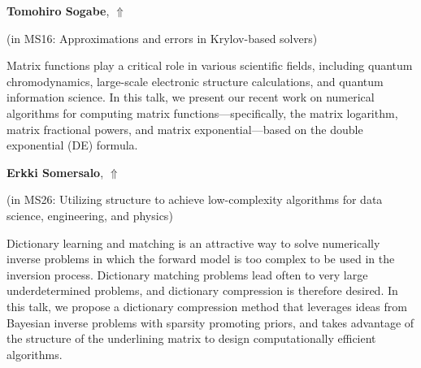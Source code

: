 \documentclass[ILAS2025-program.tex]{subfiles}
\begin{document}
\hypertarget{down0301}{}\begin{ilasabstract}
    
\textbf{Tomohiro Sogabe},  \hfill \hyperlink{up0301}{$\Uparrow$}
    
    
(in {\color{mstitle}MS16: Approximations and errors in Krylov-based solvers})
        
\mtskip
    Matrix functions play a critical role in various scientific fields, including quantum chromodynamics, large-scale electronic structure calculations, and quantum information science. In this talk, we present our recent work on numerical algorithms for computing matrix functions---specifically, the matrix logarithm, matrix fractional powers, and matrix exponential---based on the double exponential (DE) formula.


\end{ilasabstract}
    

\hypertarget{down0027}{}\begin{ilasabstract}
    
\textbf{Erkki Somersalo},  \hfill \hyperlink{up0027}{$\Uparrow$}
    
    
(in {\color{mstitle}MS26: Utilizing structure to achieve low-complexity algorithms for data science, engineering, and physics})
        
\mtskip
    Dictionary learning and matching is an attractive way to solve numerically inverse problems in which the forward model is too complex to be used in the inversion process.
Dictionary matching problems lead often to very large underdetermined problems, and dictionary compression is therefore desired. In this talk, we propose a dictionary
compression method that leverages ideas from Bayesian inverse problems with sparsity promoting priors, and takes advantage of the structure of the underlining matrix to design computationally efficient algorithms.

\end{ilasabstract}
    
\end{document}
